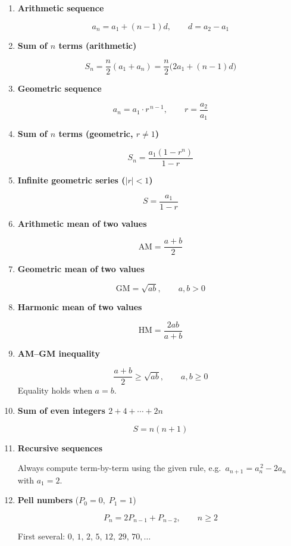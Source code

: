 \documentclass[10pt,letterpaper]{article}
\begin{document}
\begin{enumerate}

\item \textbf{Arithmetic sequence}

$$a_n = a_1 + (n-1)d, \qquad d = a_2 - a_1$$

\item \textbf{Sum of $n$ terms (arithmetic)}

$$S_n = \frac{n}{2}(a_1 + a_n) = \frac{n}{2}\bigl(2a_1+(n-1)d\bigr)$$

\item \textbf{Geometric sequence}

$$a_n = a_1 \cdot r^{\,n-1}, \qquad r = \frac{a_2}{a_1}$$

\item \textbf{Sum of $n$ terms (geometric, $r \ne 1$)}

$$S_n = \frac{a_1(1-r^n)}{1-r}$$

\item \textbf{Infinite geometric series ($|r| < 1$)}

$$S = \frac{a_1}{1-r}$$

\item \textbf{Arithmetic mean of two values}

$$\text{AM} = \frac{a+b}{2}$$

\item \textbf{Geometric mean of two values}

$$\text{GM} = \sqrt{ab}, \qquad a,b > 0$$

\item \textbf{Harmonic mean of two values}

$$\text{HM} = \frac{2ab}{a+b}$$

\item \textbf{AM--GM inequality}

$$\frac{a+b}{2} \ge \sqrt{ab}, \qquad a,b \ge 0$$
Equality holds when $a = b$.

\item \textbf{Sum of even integers $2 + 4 + \cdots + 2n$}

$$S = n(n+1)$$

\item \textbf{Recursive sequences}

Always compute term-by-term using the given rule, e.g.\ $a_{n+1} = a_n^{\,2} - 2a_n$ with $a_1 = 2$.

\item \textbf{Pell numbers} ($P_0=0,\; P_1=1$)

$$P_n = 2P_{n-1} + P_{n-2}, \qquad n \ge 2$$

First several: $0,\,1,\,2,\,5,\,12,\,29,\,70,\ldots$

\end{enumerate}
\end{document}
